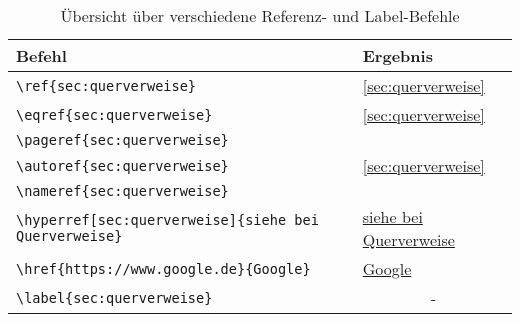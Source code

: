 \begin{table}[H]
    \centering
    \begin{tabular}{ll}
        \toprule
        \textbf{Befehl}                                                              & \textbf{Ergebnis}                                   \\
        \midrule
        \texttt{\textbackslash ref\{sec:querverweise\}}                              & \ref{sec:querverweise}                              \\
        \texttt{\textbackslash eqref\{sec:querverweise\}}                            & \eqref{sec:querverweise}                            \\
        \texttt{\textbackslash pageref\{sec:querverweise\}}                          & \pageref{sec:querverweise}                          \\
        \texttt{\textbackslash autoref\{sec:querverweise\}}                          & \autoref{sec:querverweise}                          \\
        \texttt{\textbackslash nameref\{sec:querverweise\}}                          & \nameref{sec:querverweise}                          \\
        \texttt{\textbackslash hyperref[sec:querverweise]\{siehe bei Querverweise\}} & \hyperref[sec:querverweise]{siehe bei Querverweise} \\
        \texttt{\textbackslash href\{https://www.google.de\}\{Google\}}              & \href{https://www.google.de}{Google}                \\
        \midrule
        \texttt{\textbackslash label\{sec:querverweise\}}                            & \multicolumn{1}{c}{-}                               \\
        \bottomrule
    \end{tabular}
    \caption{Übersicht über verschiedene Referenz- und Label-Befehle}
    \label{tab:querverweise}
\end{table}